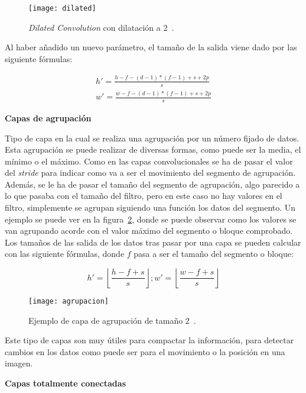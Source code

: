 \begin{figure}[h]
	\centering
	\texttt{[image: dilated]}
	\caption{\textit{Dilated Convolution} con dilatación a 2~\cite{cnn}.}
	\label{fig:dilated}
\end{figure}

Al haber añadido un nuevo parámetro, el tamaño de la salida viene dado por las siguiente fórmulas:

\begin{equation}
\begin{split}
h'=\frac{h-f-(d-1)*(f-1)+s+2p}{s}\\w'=\frac{w-f-(d-1)*(f-1)+s+2p}{s}
\end{split}
\end{equation}

\textbf{Capas de agrupación}

Tipo de capa en la cual se realiza una agrupación por un número fijado de datos. Esta agrupación se puede realizar de diversas formas, como puede ser la media, el mínimo o el máximo. Como en las capas convolucionales se ha de pasar el valor del \textit{stride} para indicar como va a ser el movimiento del segmento de agrupación. Además, se le ha de pasar el tamaño del segmento de agrupación, algo parecido a lo que pasaba con el tamaño del filtro, pero en este caso no hay valores en el filtro, simplemente se agrupan siguiendo una función los datos del segmento. Un ejemplo se puede ver en la figura~\ref{fig:agrupacion}, donde se puede observar como los valores se van agrupando acorde con el valor máximo del segmento o bloque comprobado. Los tamaños de las salida de los datos tras pasar por una capa se pueden calcular con las siguiente fórmulas, donde $f$ pasa a ser el tamaño del segmento o bloque:

\begin{equation}
h'=\left \lfloor \frac{h-f+s}{s} \right \rfloor;w'=\left \lfloor \frac{w-f+s}{s} \right \rfloor
\end{equation}

\begin{figure}[h]
	\centering
	\texttt{[image: agrupacion]}
	\caption{Ejemplo de capa de agrupación de tamaño 2~\cite{cnn}.}
	\label{fig:agrupacion}
\end{figure}

Este tipo de capas son muy útiles para compactar la información, para detectar cambios en los datos como puede ser para el movimiento o la posición en una imagen.

\textbf{Capas totalmente conectadas}

